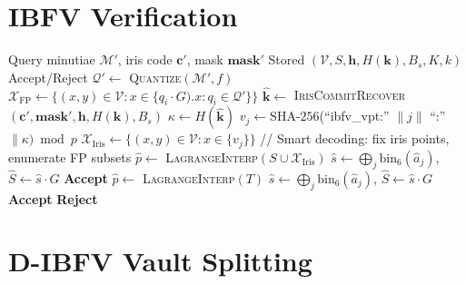 \section{IBFV Verification}

\begin{algorithm}[H]
\caption{IBFV Verification}
\label{alg:ibfv_verify}
\begin{algorithmic}[1]
\Require Query minutiae $\mathcal{M}'$, iris code $\mathbf{c}'$, mask $\mathbf{mask}'$
\Require Stored $(\mathcal{V}, S, \mathbf{h}, H(\mathbf{k}), B_s, K, k)$
\Ensure Accept/Reject
\State $\mathcal{Q}' \leftarrow$ \textsc{Quantize}$(\mathcal{M}', f)$
\State $\mathcal{X}_{\mathrm{FP}} \leftarrow \{(x,y) \in \mathcal{V} : x \in \{q_i \cdot G).x : q_i \in \mathcal{Q}'\}\}$
\State $\hat{\mathbf{k}} \leftarrow$ \textsc{IrisCommitRecover}$(\mathbf{c}', \mathbf{mask}', \mathbf{h}, H(\mathbf{k}), B_s)$
 
  \State $\kappa \leftarrow H(\hat{\mathbf{k}})$
    \State $v_j \leftarrow \mathrm{SHA}\text{-}256$(``ibfv\_vpt:'' $\| j \|$ ``:'' $\| \kappa) \bmod p$
  \EndFor
  \State $\mathcal{X}_{\mathrm{Iris}} \leftarrow \{(x,y) \in \mathcal{V} : x \in \{v_j\}\}$
  \State // Smart decoding: fix iris points, enumerate FP subsets
    \State $\hat{p} \leftarrow$ \textsc{LagrangeInterp}$(S \cup \mathcal{X}_{\mathrm{Iris}})$
    \State $\hat{s} \leftarrow \bigoplus_j \mathrm{bin}_6(\hat{a}_j)$, $\hat{S} \leftarrow \hat{s} \cdot G$
     \Return \textbf{Accept} \EndIf
  \EndFor
\Else {}
    \State $\hat{p} \leftarrow$ \textsc{LagrangeInterp}$(T)$
    \State $\hat{s} \leftarrow \bigoplus_j \mathrm{bin}_6(\hat{a}_j)$, $\hat{S} \leftarrow \hat{s} \cdot G$
     \Return \textbf{Accept} \EndIf
  \EndFor
\EndIf
\State \Return \textbf{Reject}
\end{algorithmic}
\end{algorithm}

\section{D-IBFV Vault Splitting}

